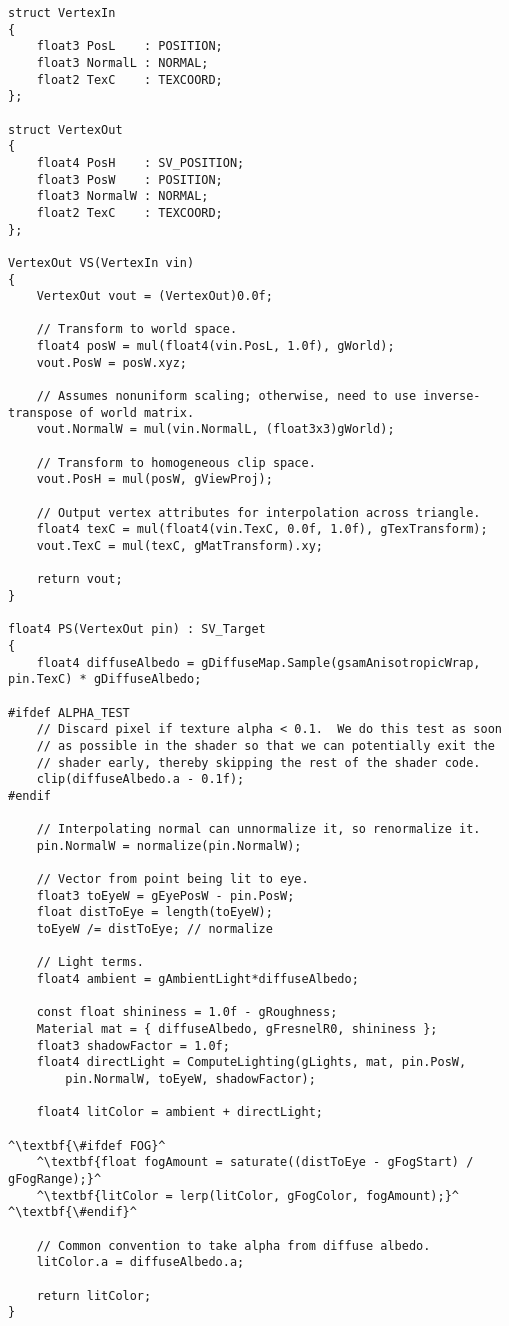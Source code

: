 \begin{lstlisting}[escapechar=^]
struct VertexIn
{
    float3 PosL    : POSITION;
    float3 NormalL : NORMAL;
    float2 TexC    : TEXCOORD;
};

struct VertexOut
{
    float4 PosH    : SV_POSITION;
    float3 PosW    : POSITION;
    float3 NormalW : NORMAL;
    float2 TexC    : TEXCOORD;
};

VertexOut VS(VertexIn vin)
{
    VertexOut vout = (VertexOut)0.0f;
    
    // Transform to world space.
    float4 posW = mul(float4(vin.PosL, 1.0f), gWorld);
    vout.PosW = posW.xyz;

    // Assumes nonuniform scaling; otherwise, need to use inverse-transpose of world matrix.
    vout.NormalW = mul(vin.NormalL, (float3x3)gWorld);

    // Transform to homogeneous clip space.
    vout.PosH = mul(posW, gViewProj);
    
    // Output vertex attributes for interpolation across triangle.
    float4 texC = mul(float4(vin.TexC, 0.0f, 1.0f), gTexTransform);
    vout.TexC = mul(texC, gMatTransform).xy;

    return vout;
}

float4 PS(VertexOut pin) : SV_Target
{
    float4 diffuseAlbedo = gDiffuseMap.Sample(gsamAnisotropicWrap, pin.TexC) * gDiffuseAlbedo;
    
#ifdef ALPHA_TEST
    // Discard pixel if texture alpha < 0.1.  We do this test as soon 
    // as possible in the shader so that we can potentially exit the
    // shader early, thereby skipping the rest of the shader code.
    clip(diffuseAlbedo.a - 0.1f);
#endif

    // Interpolating normal can unnormalize it, so renormalize it.
    pin.NormalW = normalize(pin.NormalW);

    // Vector from point being lit to eye. 
    float3 toEyeW = gEyePosW - pin.PosW;
    float distToEye = length(toEyeW);
    toEyeW /= distToEye; // normalize

    // Light terms.
    float4 ambient = gAmbientLight*diffuseAlbedo;

    const float shininess = 1.0f - gRoughness;
    Material mat = { diffuseAlbedo, gFresnelR0, shininess };
    float3 shadowFactor = 1.0f;
    float4 directLight = ComputeLighting(gLights, mat, pin.PosW,
        pin.NormalW, toEyeW, shadowFactor);

    float4 litColor = ambient + directLight;

^\textbf{\#ifdef FOG}^
    ^\textbf{float fogAmount = saturate((distToEye - gFogStart) / gFogRange);}^
    ^\textbf{litColor = lerp(litColor, gFogColor, fogAmount);}^
^\textbf{\#endif}^

    // Common convention to take alpha from diffuse albedo.
    litColor.a = diffuseAlbedo.a;

    return litColor;
}
\end{lstlisting}

